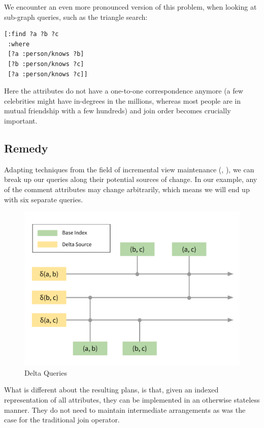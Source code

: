 \documentclass[../catalog.tex]{subfiles}
\begin{document}
We encounter an even more pronounced version of this problem, when
looking at sub-graph queries, such as the triangle search:

\begin{verbatim}
[:find ?a ?b ?c
 :where
 [?a :person/knows ?b]
 [?b :person/knows ?c]
 [?a :person/knows ?c]]
\end{verbatim}

Here the attributes do not have a one-to-one correspondence anymore (a
few celebrities might have in-degrees in the millions, whereas most
people are in mutual friendship with a few hundreds) and join order
becomes crucially important.

\subsection{Remedy}

Adapting techniques from the field of incremental view maintenance
(\cite{gupta1993maintaining}, \cite{blakeley1986efficiently}), we can
break up our queries along their potential sources of change. In our
example, any of the comment attributes may change arbitrarily, which
means we will end up with six separate queries.

\begin{figure}[h!]
  \includegraphics[width=1.0\linewidth]{diagrams/delta-queries}
  \caption{Delta Queries}
  \label{fig:delta-query-plan}
\end{figure}

What is different about the resulting plans, is that, given an indexed
representation of all attributes, they can be implemented in an
otherwise stateless manner. They do not need to maintain intermediate
arrangements as was the case for the traditional join operator.
\end{document}
